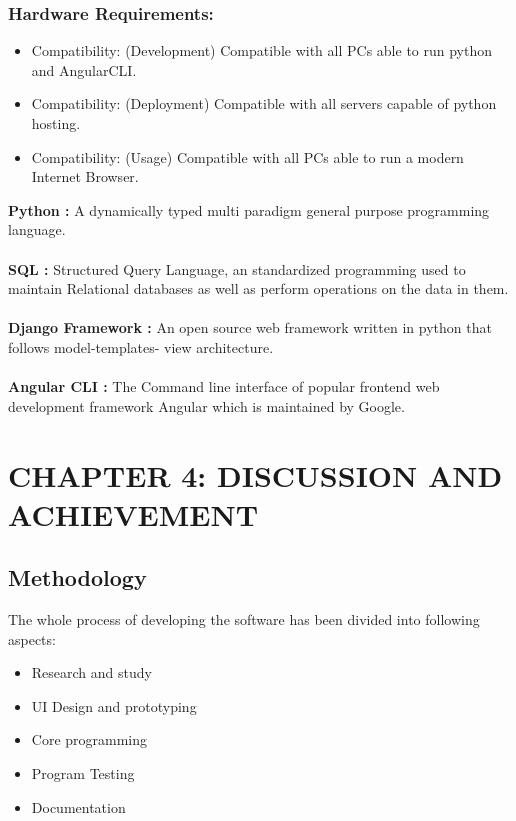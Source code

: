 \documentclass[12pt]{article}
\begin{document}
\subsubsection{Hardware Requirements:}
\begin{itemize}
    \item Compatibility: (Development) Compatible with all PCs able to run python and AngularCLI.
    \item Compatibility: (Deployment) Compatible with all servers capable of python hosting.
    \item Compatibility: (Usage) Compatible with all PCs able to run a modern Internet Browser.
\end{itemize}

\vspace*{10mm}
\textbf{Python :} A dynamically typed multi paradigm general purpose programming language.
\\\\
\textbf{SQL :} Structured Query Language, an standardized programming used to maintain Relational
databases as well as perform operations on the data in them.
\\\\
\textbf{Django Framework :} An open source web framework written in python that follows model-templates-
view architecture.
\\\\
\textbf{Angular CLI :} The Command line interface of popular frontend web development framework Angular
which is maintained by Google.

\clearpage
\section{CHAPTER 4: DISCUSSION AND  ACHIEVEMENT}

\subsection{Methodology}
The whole process of developing the software has been divided into following aspects:
\begin{itemize}
    \item Research and study
    \item UI Design and prototyping
    \item Core programming
    \item Program Testing
    \item Documentation
\end{itemize}
\end{document}
